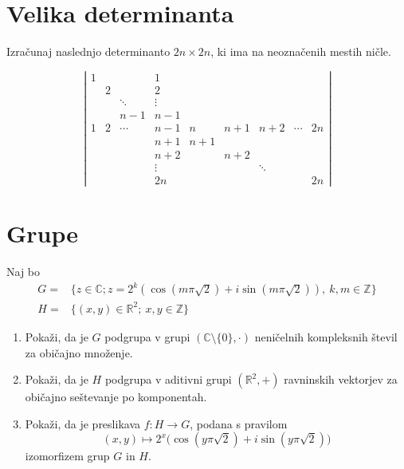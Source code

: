 \documentclass[a4paper,12pt]{article}
\begin{document}
\section*{Velika determinanta}

Izračunaj naslednjo determinanto
$2n\times2n$, ki ima na neoznačenih mestih ničle.

\[
\left|
\begin{array}{ccccccccc}
1&&&1&&&&&\\
&2&&2&&&&&\\
&&\ddots&\vdots&&&&&\\
&&n-1&n-1&&&&&\\
1&2&\cdots&n-1&n&n+1&n+2&\cdots&2n\\
&&&n+1&n+1&&&&\\
&&&n+2&&n+2&&&\\
&&&\vdots&&&\ddots&&\\
&&&2n&&&&&2n
\end{array}
\right|
\]

\section*{Grupe}

Naj bo
\begin{align*}
G={}&\{z\in\mathbb{C};
z=2^k(\cos(m\pi\sqrt{2})+
i\sin(m\pi\sqrt{2})),\
k,m\in\mathbb{Z}\}\\
H={}&\{(x,y)\in\mathbb{R}^2;\
x,y\in\mathbb{Z}\}
\end{align*}

\begin{enumerate}
    \item
    Pokaži, da je $G$ podgrupa v grupi
    $(\mathbb{C}\setminus\{0\},\cdot)$
    neničelnih kompleksnih števil za običajno množenje.

    \item
    Pokaži, da je $H$ podgrupa v aditivni grupi
    $(\mathbb{R}^2,+)$ ravninskih vektorjev
    za običajno seštevanje po komponentah.

    \item
    Pokaži, da je preslikava
    $f:H\to G$, podana s pravilom
    \[
    (x,y)\mapsto
    2^x\bigl(\cos(y\pi\sqrt{2})+
    i\sin(y\pi\sqrt{2})\bigr)
    \]
    izomorfizem grup $G$ in $H$.
\end{enumerate}
\end{document}
